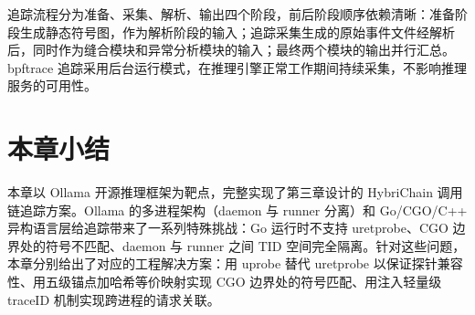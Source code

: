 追踪流程分为准备、采集、解析、输出四个阶段，前后阶段顺序依赖清晰：准备阶段生成静态符号图，作为解析阶段的输入；追踪采集生成的原始事件文件经解析后，同时作为缝合模块和异常分析模块的输入；最终两个模块的输出并行汇总。bpftrace 追踪采用后台运行模式，在推理引擎正常工作期间持续采集，不影响推理服务的可用性。

\section{本章小结}

本章以 Ollama 开源推理框架为靶点，完整实现了第三章设计的 HybriChain 调用链追踪方案。Ollama 的多进程架构（daemon 与 runner 分离）和 Go/CGO/C++ 异构语言层给追踪带来了一系列特殊挑战：Go 运行时不支持 uretprobe、CGO 边界处的符号不匹配、daemon 与 runner 之间 TID 空间完全隔离。针对这些问题，本章分别给出了对应的工程解决方案：用 uprobe 替代 uretprobe 以保证探针兼容性、用五级锚点加哈希等价映射实现 CGO 边界处的符号匹配、用注入轻量级 traceID 机制实现跨进程的请求关联。